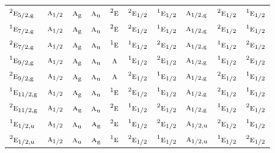 \documentclass[10pt,a4paper]{article}
\numberwithin{equation}{section}
\newcommand{\irr}[1]{\text{\normalfont\scshape #1}}
\newcommand{\conjpair}[1]{{}^{#1}}
\newcommand{\ptag}[1]{\mathrm{#1}}
\begin{document}
{\begin{longtable}{@{}lccccccccc@{}}
$\conjpair{2}\irr{e}_{5/2,\ptag{g}}$ & $\irr{a}_{1/2}$ & $\irr{a}_{\ptag{g}}$ & $\irr{a}_{\ptag{u}}$ & $\conjpair{2}\irr{e}$ & $\conjpair{2}\irr{e}_{1/2}$ & $\conjpair{1}\irr{e}_{1/2}$ & $\irr{a}_{1/2,\ptag{g}}$ & $\conjpair{2}\irr{e}_{1/2}$ & $\conjpair{1}\irr{e}_{1/2}$\\
$\conjpair{1}\irr{e}_{7/2,\ptag{g}}$ & $\irr{a}_{1/2}$ & $\irr{a}_{\ptag{g}}$ & $\irr{a}_{\ptag{u}}$ & $\conjpair{2}\irr{e}$ & $\conjpair{2}\irr{e}_{1/2}$ & $\conjpair{1}\irr{e}_{1/2}$ & $\irr{a}_{1/2,\ptag{g}}$ & $\conjpair{2}\irr{e}_{1/2}$ & $\conjpair{1}\irr{e}_{1/2}$\\
$\conjpair{2}\irr{e}_{7/2,\ptag{g}}$ & $\irr{a}_{1/2}$ & $\irr{a}_{\ptag{g}}$ & $\irr{a}_{\ptag{u}}$ & $\conjpair{1}\irr{e}$ & $\conjpair{1}\irr{e}_{1/2}$ & $\conjpair{2}\irr{e}_{1/2}$ & $\irr{a}_{1/2,\ptag{g}}$ & $\conjpair{1}\irr{e}_{1/2}$ & $\conjpair{2}\irr{e}_{1/2}$\\
$\conjpair{1}\irr{e}_{9/2,\ptag{g}}$ & $\irr{a}_{1/2}$ & $\irr{a}_{\ptag{g}}$ & $\irr{a}_{\ptag{u}}$ & $\irr{a}$ & $\conjpair{1}\irr{e}_{1/2}$ & $\conjpair{2}\irr{e}_{1/2}$ & $\irr{a}_{1/2,\ptag{g}}$ & $\conjpair{1}\irr{e}_{1/2}$ & $\conjpair{2}\irr{e}_{1/2}$\\
$\conjpair{2}\irr{e}_{9/2,\ptag{g}}$ & $\irr{a}_{1/2}$ & $\irr{a}_{\ptag{g}}$ & $\irr{a}_{\ptag{u}}$ & $\irr{a}$ & $\conjpair{2}\irr{e}_{1/2}$ & $\conjpair{1}\irr{e}_{1/2}$ & $\irr{a}_{1/2,\ptag{g}}$ & $\conjpair{2}\irr{e}_{1/2}$ & $\conjpair{1}\irr{e}_{1/2}$\\
$\conjpair{1}\irr{e}_{11/2,\ptag{g}}$ & $\irr{a}_{1/2}$ & $\irr{a}_{\ptag{g}}$ & $\irr{a}_{\ptag{u}}$ & $\conjpair{1}\irr{e}$ & $\conjpair{2}\irr{e}_{1/2}$ & $\conjpair{1}\irr{e}_{1/2}$ & $\irr{a}_{1/2,\ptag{g}}$ & $\conjpair{2}\irr{e}_{1/2}$ & $\conjpair{1}\irr{e}_{1/2}$\\
$\conjpair{2}\irr{e}_{11/2,\ptag{g}}$ & $\irr{a}_{1/2}$ & $\irr{a}_{\ptag{g}}$ & $\irr{a}_{\ptag{u}}$ & $\conjpair{2}\irr{e}$ & $\conjpair{1}\irr{e}_{1/2}$ & $\conjpair{2}\irr{e}_{1/2}$ & $\irr{a}_{1/2,\ptag{g}}$ & $\conjpair{1}\irr{e}_{1/2}$ & $\conjpair{2}\irr{e}_{1/2}$\\
$\conjpair{1}\irr{e}_{1/2,\ptag{u}}$ & $\irr{a}_{1/2}$ & $\irr{a}_{\ptag{u}}$ & $\irr{a}_{\ptag{g}}$ & $\conjpair{2}\irr{e}$ & $\conjpair{1}\irr{e}_{1/2}$ & $\conjpair{2}\irr{e}_{1/2}$ & $\irr{a}_{1/2,\ptag{u}}$ & $\conjpair{2}\irr{e}_{1/2}$ & $\conjpair{1}\irr{e}_{1/2}$\\
$\conjpair{2}\irr{e}_{1/2,\ptag{u}}$ & $\irr{a}_{1/2}$ & $\irr{a}_{\ptag{u}}$ & $\irr{a}_{\ptag{g}}$ & $\conjpair{1}\irr{e}$ & $\conjpair{2}\irr{e}_{1/2}$ & $\conjpair{1}\irr{e}_{1/2}$ & $\irr{a}_{1/2,\ptag{u}}$ & $\conjpair{1}\irr{e}_{1/2}$ & $\conjpair{2}\irr{e}_{1/2}$\\

\end{longtable}}
\end{document}
